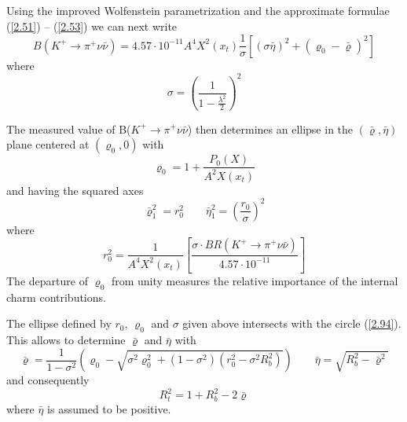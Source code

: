 Using the improved Wolfenstein parametrization and the approximate
formulae (\ref{2.51}) -- (\ref{2.53}) we can next write
\begin{equation}\label{108}
B(K^{+} \to \pi^{+} \nu \bar\nu) = 4.57 \cdot 10^{-11} A^4 X^2(x_t)
\frac{1}{\sigma} \left[ (\sigma \bar\eta)^2 +
\left(\varrho_0 - \bar\varrho \right)^2 \right]
\end{equation}
where
\begin{equation}\label{109}
\sigma = \left( \frac{1}{1- \frac{\lambda^2}{2}} \right)^2
\end{equation}

The measured value of B($K^{+} \to \pi^{+} \nu \bar\nu$) then
determines  an ellipse in the $(\bar\varrho,\bar\eta)$ plane  centered at
$(\varrho_0,0)$ with \cite{burasetal:94b}
%
\begin{equation}\label{110}
\varrho_0 = 1 + \frac{P_0(X)}{A^2 X(x_t)}
\end{equation}
%
and having the squared axes
%
\begin{equation}\label{110a}
\bar\varrho_1^2 = r^2_0 \qquad \bar\eta_1^2 = \left( \frac{r_0}{\sigma}
\right)^2
\end{equation}
%
where
%
\begin{equation}\label{111}
r^2_0 = \frac{1}{A^4 X^2(x_t)} \left[
\frac{\sigma \cdot BR(K^{+} \to \pi^{+} \nu \bar\nu)}{4.57 \cdot 10^{-11}} \right]
\end{equation}
%
The departure of $\varrho_0$ from unity measures the relative importance
of the internal charm contributions.

The ellipse defined by $r_0$, $\varrho_0$ and $\sigma$ given above
intersects with the circle (\ref{2.94}).  This allows to determine
$\bar\varrho$ and $\bar\eta$  with 
\begin{equation}\label{113}
\bar\varrho = \frac{1}{1-\sigma^2} \left( \varrho_0 - \sqrt{\sigma^2
\varrho_0^2 +(1-\sigma^2)(r_0^2-\sigma^2 R_b^2)} \right) \qquad
\bar\eta = \sqrt{R_b^2 -\bar\varrho^2}
\end{equation}
%
and consequently
%
\begin{equation}\label{113aa}
R_t^2 = 1+R_b^2 - 2 \bar\varrho
\end{equation}
%
where $\bar\eta$ is assumed to be positive.

